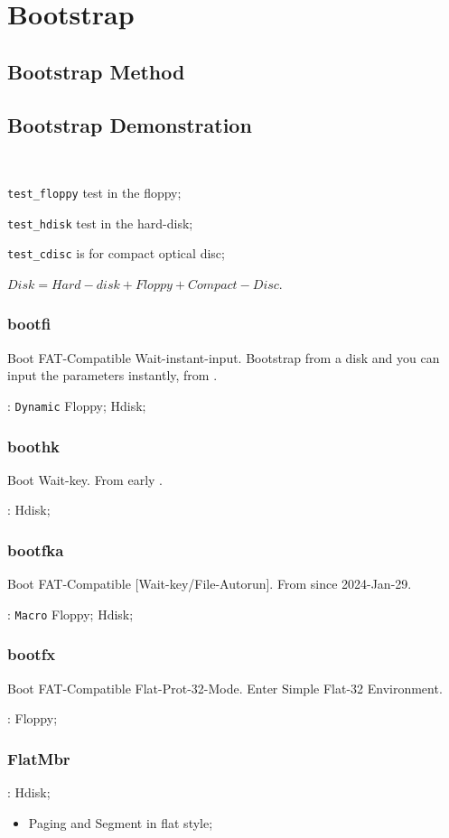 
\section{Bootstrap}

\subsection{Bootstrap Method}

\subsection{Bootstrap Demonstration} \

\verb`test_floppy` test in the floppy;

\verb`test_hdisk` test in the hard-disk;

\verb`test_cdisc` is  for compact optical disc;

$Disk = Hard-disk + Floppy + Compact-Disc$.

\subsubsection{bootfi}

Boot FAT-Compatible Wait-instant-input. Bootstrap from a disk and you can input the parameters instantly, from .

: \verb|Dynamic| Floppy; Hdisk;

\subsubsection{boothk}

Boot Wait-key. From early .

: Hdisk;

\subsubsection{bootfka}

Boot FAT-Compatible [Wait-key/File-Autorun]. From  since 2024-Jan-29.

: \verb`Macro` Floppy; Hdisk;

\subsubsection{bootfx}

Boot FAT-Compatible Flat-Prot-32-Mode. Enter Simple Flat-32 Environment.

: Floppy;

\subsubsection{FlatMbr}


: Hdisk;

\begin{itemize}
	\item Paging and Segment in flat style;
\end{itemize}
